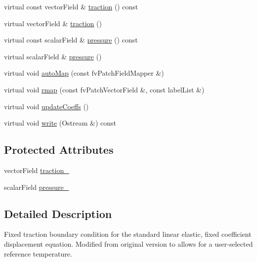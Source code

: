 \begin{DoxyCompactItemize}
\item 
virtual const vector\+Field \& \hyperlink{classFoam_1_1tractionDisplacementFvPatchVectorField_ab7c98b1c31ba7f0dd4213295ff27694f}{traction} () const
\item 
virtual vector\+Field \& \hyperlink{classFoam_1_1tractionDisplacementFvPatchVectorField_a939d19fdb52ceecdfe381580d01deae2}{traction} ()
\item 
virtual const scalar\+Field \& \hyperlink{classFoam_1_1tractionDisplacementFvPatchVectorField_a74e4949548f54559ec29ed380af143d5}{pressure} () const
\item 
virtual scalar\+Field \& \hyperlink{classFoam_1_1tractionDisplacementFvPatchVectorField_af852a87521e153bea550ab3452480208}{pressure} ()
\item 
virtual void \hyperlink{classFoam_1_1tractionDisplacementFvPatchVectorField_a0ab0c43ce90d756c88dd81e3d0a9eef5}{auto\+Map} (const fv\+Patch\+Field\+Mapper \&)
\item 
virtual void \hyperlink{classFoam_1_1tractionDisplacementFvPatchVectorField_a4fe41b169c41bfcd4311c1d1e27a96ed}{rmap} (const fv\+Patch\+Vector\+Field \&, const label\+List \&)
\item 
virtual void \hyperlink{classFoam_1_1tractionDisplacementFvPatchVectorField_a7e24eafac629d3733181cd942d4c902f}{update\+Coeffs} ()
\item 
virtual void \hyperlink{classFoam_1_1tractionDisplacementFvPatchVectorField_a293fdfec8bdfbd5c3913ab4c9f3454ff}{write} (Ostream \&) const
\end{DoxyCompactItemize}
\subsection*{Protected Attributes}
\begin{DoxyCompactItemize}
\item 
vector\+Field \hyperlink{classFoam_1_1tractionDisplacementFvPatchVectorField_ae25e34f268447e0670b08a1ee77c5d7c}{traction\+\_\+}
\item 
scalar\+Field \hyperlink{classFoam_1_1tractionDisplacementFvPatchVectorField_a753df8fd86b075ec139aaecc1115dacc}{pressure\+\_\+}
\end{DoxyCompactItemize}


\subsection{Detailed Description}
Fixed traction boundary condition for the standard linear elastic, fixed coefficient displacement equation. Modified from original version to allows for a user-\/selected reference temperature. 

